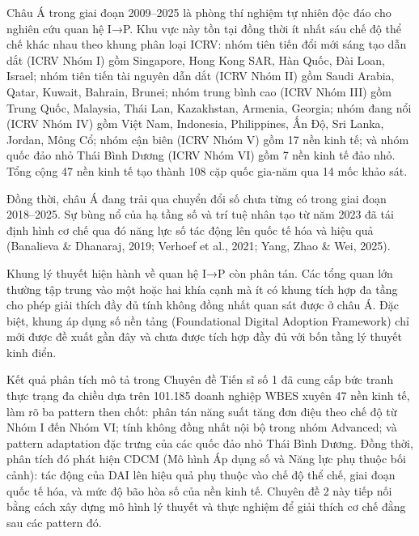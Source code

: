 \documentclass[12pt,a4paper]{article}
\begin{document}
Châu Á trong giai đoạn 2009--2025 là phòng thí nghiệm tự nhiên độc đáo
cho nghiên cứu quan hệ I→P. Khu vực này tồn tại đồng thời ít nhất sáu
chế độ thể chế khác nhau theo khung phân loại ICRV: nhóm tiên tiến đổi
mới sáng tạo dẫn dắt (ICRV Nhóm I) gồm Singapore, Hong Kong SAR, Hàn
Quốc, Đài Loan, Israel; nhóm tiên tiến tài nguyên dẫn dắt (ICRV Nhóm II)
gồm Saudi Arabia, Qatar, Kuwait, Bahrain, Brunei; nhóm trung bình cao
(ICRV Nhóm III) gồm Trung Quốc, Malaysia, Thái Lan, Kazakhstan, Armenia,
Georgia; nhóm đang nổi (ICRV Nhóm IV) gồm Việt Nam, Indonesia,
Philippines, Ấn Độ, Sri Lanka, Jordan, Mông Cổ; nhóm cận biên (ICRV Nhóm
V) gồm 17 nền kinh tế; và nhóm quốc đảo nhỏ Thái Bình Dương (ICRV Nhóm
VI) gồm 7 nền kinh tế đảo nhỏ. Tổng cộng 47 nền kinh tế tạo thành 108
cặp quốc gia-năm qua 14 mốc khảo sát.

Đồng thời, châu Á đang trải qua chuyển đổi số chưa từng có trong giai
đoạn 2018--2025. Sự bùng nổ của hạ tầng số và trí tuệ nhân tạo từ năm
2023 đã tái định hình cơ chế qua đó năng lực số tác động lên quốc tế hóa
và hiệu quả (Banalieva \& Dhanaraj, 2019; Verhoef et al., 2021; Yang,
Zhao \& Wei, 2025).

Khung lý thuyết hiện hành về quan hệ I→P còn phân tán. Các tổng quan lớn
thường tập trung vào một hoặc hai khía cạnh mà ít có khung tích hợp đa
tầng cho phép giải thích đầy đủ tính không đồng nhất quan sát được ở
châu Á. Đặc biệt, khung áp dụng số nền tảng (Foundational Digital
Adoption Framework) chỉ mới được đề xuất gần đây và chưa được tích hợp
đầy đủ với bốn tầng lý thuyết kinh điển.

Kết quả phân tích mô tả trong Chuyên đề Tiến sĩ số 1 đã cung cấp bức
tranh thực trạng đa chiều dựa trên 101.185 doanh nghiệp WBES xuyên 47
nền kinh tế, làm rõ ba pattern then chốt: phân tán năng suất tăng đơn
điệu theo chế độ từ Nhóm I đến Nhóm VI; tính không đồng nhất nội bộ
trong nhóm Advanced; và pattern adaptation đặc trưng của các quốc đảo
nhỏ Thái Bình Dương. Đồng thời, phân tích đó phát hiện CDCM (Mô hình Áp
dụng số và Năng lực phụ thuộc bối cảnh): tác động của DAI lên hiệu quả
phụ thuộc vào chế độ thể chế, giai đoạn quốc tế hóa, và mức độ bão hòa
số của nền kinh tế. Chuyên đề 2 này tiếp nối bằng cách xây dựng mô hình
lý thuyết và thực nghiệm để giải thích cơ chế đằng sau các pattern đó.
\end{document}
